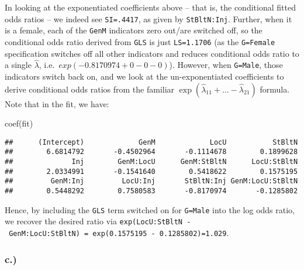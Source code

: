 \documentclass[
]{article}
\newenvironment{Shaded}{\begin{snugshade}}{\end{snugshade}}
\newcommand{\FunctionTok}[1]{\textcolor[rgb]{0.00,0.00,0.00}{#1}}
\newcommand{\NormalTok}[1]{#1}
\begin{document}
In looking at the exponentiated coefficients above -- that is, the
conditional fitted odds ratios -- we indeed see \texttt{SI=.4417}, as
given by \texttt{StBltN:Inj}. Further, when it is a female, each of the
\texttt{GenM} indicators zero out/are switched off, so the conditional
odds ratio derived from \texttt{GLS} is just \texttt{LS=1.1706} (as the
\texttt{G=Female} specification switches off all other indicators and
reduces conditional odds ratio to a single \(\hat\lambda\),
i.e.~\(exp(-0.8170974 + 0 - 0 - 0)\)). However, when \texttt{G=Male},
those indicators switch back on, and we look at the un-exponentiated
coefficients to derive conditional odds ratios from the familiar
\(\exp(\hat\lambda_{11} + \ldots -\hat\lambda_{21})\) formula. Note that
in the fit, we have:

\begin{Shaded}
\begin{Highlighting}[]
\FunctionTok{coef}\NormalTok{(fit)}
\end{Highlighting}
\end{Shaded}

\begin{verbatim}
##      (Intercept)             GenM             LocU           StBltN 
##        6.6814792       -0.4502964       -0.1114678        0.1899628 
##              Inj        GenM:LocU      GenM:StBltN      LocU:StBltN 
##        2.0334991       -0.1541640        0.5418622        0.1575195 
##         GenM:Inj         LocU:Inj       StBltN:Inj GenM:LocU:StBltN 
##        0.5448292        0.7580583       -0.8170974       -0.1285802
\end{verbatim}

Hence, by including the \texttt{GLS} term switched on for
\texttt{G=Male} into the log odds ratio, we recover the desired ratio
via
\texttt{exp(LocU:StBltN\ -\ GenM:LocU:StBltN)\ =\ exp(0.1575195\ -\ 0.1285802)=1.029}.

\hypertarget{c.-3}{%
\subsubsection{c.)}\label{c.-3}}
\end{document}
